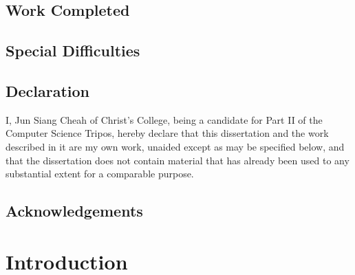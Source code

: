 \documentclass[12pt,a4paper,twoside,openright]{report}
\begin{document}
\section*{Work Completed}


\section*{Special Difficulties}

\newpage
\section*{Declaration}

I, Jun Siang Cheah of Christ's College, being a candidate for Part II of the Computer
Science Tripos, hereby declare that this dissertation and the work described in it are my own work,
unaided except as may be specified below, and that the dissertation
does not contain material that has already been used to any substantial
extent for a comparable purpose.

\bigskip
{}

\medskip
{}

\tableofcontents


\newpage
\section*{Acknowledgements}




\pagestyle{headings}

\chapter{Introduction}

\end{document}
